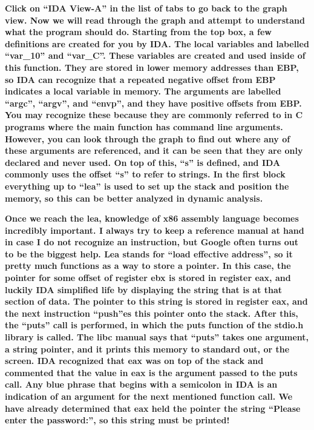 \documentclass[letterpaper]{article}
\newcommand{\sitfig}[3]{
\begin{figure}[H]
\centering
\makebox[\textwidth][c]{
#2
}
\label{#1}
\end{figure}
}
\newcommand{\sitgfx}[4][scale=1.0]{
\sitfig{#3}{\texttt{[image: \#2]}}{#4}
}
\begin{document}
\textbf{Click on ``IDA View-A'' in the list of tabs to go back to the graph view. Now we will read through the graph and
attempt to understand what the program should do. Starting from the top box, a few definitions are created for you by
IDA. The local variables and labelled ``var\_10'' and ``var\_C''. These variables are created and used inside of this
function. They are stored in lower memory addresses than EBP, so IDA can recognize that a repeated negative offset from
EBP indicates a local variable in memory. The arguments are labelled ``argc'', ``argv'', and ``envp'', and they have
positive offsets from EBP. You may recognize these because they are commonly referred to in C programs where the main
function has command line arguments. However, you can look through the graph to find out where any of these arguments
are referenced, and it can be seen that they are only declared and never used. On top of this, ``s'' is defined, and
IDA commonly uses the offset ``s'' to refer to strings. In the first block everything up to ``lea'' is used to set up
the stack and position the memory, so this can be better analyzed in dynamic analysis. }  
\sitgfx[width=6.4583in,height=2.4791in]{FINALWORKINGDOCFORMERLYPRECURSOR-img047.png}{fig:unk}{TODO CAPTION}
 \textbf{Once we reach the lea, knowledge of x86 assembly language becomes incredibly important. I always try to keep a
reference manual at hand in case I do not recognize an instruction, but Google often turns out to be the biggest help.
Lea stands for ``load effective address'', so it pretty much functions as a way to store a pointer. In this case, the
pointer for some offset of register ebx is stored in register eax, and luckily IDA simplified life by displaying the
string that is at that section of data. The pointer to this string is stored in register eax, and the next instruction
``push''es this pointer onto the stack. After this, the ``puts'' call is performed, in which the puts function of the
stdio.h library is called. The libc manual says that ``puts'' takes one argument, a string pointer, and it prints this
memory to standard out, or the screen. IDA recognized that eax was on top of the stack and commented that the value in
eax is the argument passed to the puts call. Any blue phrase that begins with a semicolon in IDA is an indication of an
argument for the next mentioned function call. We have already determined that eax held the pointer the string ``Please
enter the password:'', so this string must be printed!}
\end{document}
